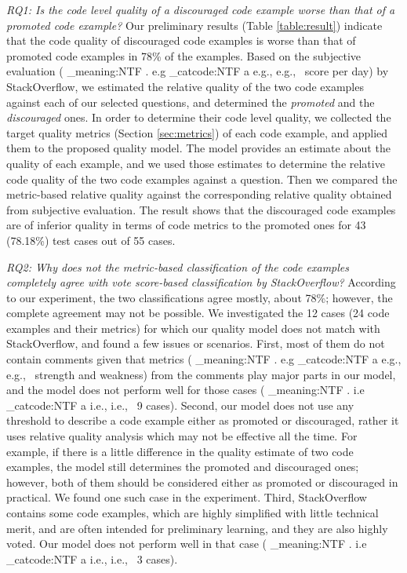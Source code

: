\documentclass{sig-alternate}
\makeatletter
\newcommand\latinabbrev[1]{
  \peek_meaning:NTF . {%
    #1\@}%
  { \peek_catcode:NTF a {%
      #1., \@ }%
    {#1., \@}}}
\def\eg{\latinabbrev{e.g}}
\def\ie{\latinabbrev{i.e}}
\makeatother
\begin{document}
\emph{RQ1: Is the code level quality of a discouraged code example worse than that of a promoted code example?} Our preliminary results (Table \ref{table:result}) indicate that the code quality of discouraged code examples is worse than that of promoted code examples in 78\% of the examples. Based on the subjective evaluation (\eg\ score per day) by StackOverflow, we estimated the relative quality of the two code examples against each of our selected questions, and determined the \emph{promoted} and the \emph{discouraged} ones. In order to determine their code level quality, we collected the target quality metrics (Section \ref{sec:metrics}) of each code example, and applied them to the proposed quality model. The model provides an estimate about the quality of each example, and we used those estimates to determine the relative code quality of the two code examples against a question. Then we compared the metric-based relative quality against the corresponding relative quality obtained from subjective evaluation. The result shows that the discouraged code examples are of inferior quality in terms of code metrics to the promoted ones for 43 (78.18\%) test cases out of 55 cases.

\emph{RQ2: Why does not the metric-based classification of the code examples completely agree with vote score-based classification by StackOverflow?} According to our experiment,  the two classifications agree mostly, about 78\%; however, the complete agreement may not be possible. We investigated the 12 cases (24 code examples and their metrics) for which our quality model does not match with StackOverflow, and found a few issues or scenarios. First, most of them do not contain comments given that metrics (\eg\ strength and weakness) from the comments play major parts in our model, and the model does not perform well for those cases (\ie\ 9 cases). Second, our model does not use any threshold to describe a code example either as promoted or discouraged, rather it uses relative quality analysis which may not be effective all the time. For example, if there is a little difference in the quality estimate of two code examples, the model still determines the promoted and discouraged ones; however, both of them should be considered either as promoted or discouraged in practical. We found one such case in the experiment. Third, StackOverflow contains some code examples, which are highly simplified with little technical merit, and are often intended for preliminary learning, and they are also highly voted. Our model does not perform well in that case (\ie\ 3 cases). 
\end{document}
